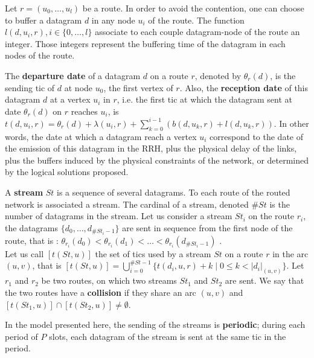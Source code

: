 \documentclass[10pt]{article}
\begin{document}
          Let $r=(u_0,\dots,u_l)$ be a route. In order to avoid the contention, one can choose to buffer a datagram $d$ in any node $u_i$ of the route. The function $l(d,u_i,r), i \in \{0,\ldots,l\}$ associate to each couple datagram-node of the route an integer. Those integers represent the buffering time of the datagram in each nodes of the route.
              
The \textbf{departure date} of a datagram $d$ on a route $r$, denoted by $\theta_r(d)$, is the sending tic of $d$ at node $u_0$, the first vertex of $r$. 
 Also, the \textbf{reception date} of this datagram $d$ at a vertex $u_i$ in $r$, i.e. the first tic at which the datagram sent at date $\theta_r(d)$ on $r$ reaches $u_i$, is $t(d,u_i,r) = \theta_r(d) + \lambda(u_i,r) + \sum_{k=0}^{i-1}( b(d,u_k,r) + l(d,u_k,r))$. In other words, the date at which a datagram reach a vertex $u_i$ correspond to the date of the emission of this datagram in the RRH, plus the physical delay of the links, plus the buffers induced by the physical constraints of the network, or determined by the logical solutions proposed.
   
        A {\bf stream} $St$ is a sequence of several datagrams. To each route of the routed network is associated a stream. The cardinal of a stream, denoted $\#St$ is the number of datagrams in the stream. Let us consider a stream $St_i$ on the route $r_i$, the datagrams $\{d_0,\ldots,d_{\#St_i-1}\}$ are sent in sequence from the first node of the route, that is : $\theta_{r_i}(d_0) < \theta_{r_i}(d_1) < \ldots < \theta_{r_i}(d_{\#St_i-1})$ .  \\
        
          
       Let us call $[t(St,u)]$ the set of tics used by a stream $St$ on a route $r$ in the arc $(u,v)$, that is $[t(St,u)] =  \bigcup_{i=0}^{\#St -1} \{t(d_i,u,r) + k \mid 0 \leq k < |d_i|_{(u,v)}\}$.
      Let $r_1$ and $r_2$ be two routes, on which two streams $St_1$ and $St_2$ are sent.
      We say that the two routes have a {\bf collision} if they share an arc $(u,v)$ and $[t(St_1,u)] \cap [t(St_2,u)] \neq \emptyset$.
      
      In the model presented here, the sending of the streams is \textbf{periodic}; during each period of $P$ slots, each datagram of the stream is sent at the same tic in the period.
            
\end{document}

